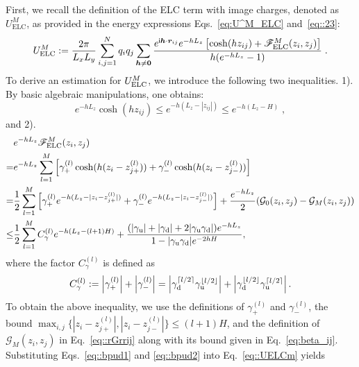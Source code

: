 First, we recall the definition of the ELC term with image charges, denoted as $U_{\text{ELC}}^{M}$, as provided in the energy expressions Eqs.~\eqref{eq:U^M_ELC} and~\eqref{eq::23}:
\begin{equation}\label{eq::UELCm}
U_{\text{ELC}}^{M}:=\frac{2\pi}{L_xL_y}\sum_{i,j=1}^{N}q_iq_j\sum_{\bm{h}\neq \bm{0}} \frac{e^{\mathsf i \bm{h}\cdot\bm{r}_{ij}}e^{-hL_z}\left[\cosh(hz_{ij})+\mathscr{F}_{\text{ELC}}^{M}(z_i,z_j)\right]}{h(e^{-hL_z}-1)}\;.
\end{equation}
To derive an estimation for $U_{\text{ELC}}^{M}$, we introduce the following two inequalities. 
1). By basic algebraic manipulations, one obtains:  
\begin{equation}\label{eq::bpud1}
e^{-hL_z}\cosh(hz_{ij})\leq e^{-h(L_z-|z_{ij}|)}\leq e^{-h(L_z-H)}\;,
\end{equation}
and 2).
\begin{equation}\label{eq::bpud2}
\begin{split}
& e^{-hL_z}\mathscr{F}_{\text{ELC}}^{M}(z_i,z_j) \\
= & e^{-hL_z}\sum\limits_{l=1}^{M}\left[\gamma_{+}^{(l)}\cosh(h(z_i-z_{j+}^{(l)}))+\gamma_{-}^{(l)}\cosh(h(z_i-z_{j-}^{(l)}))\right]\\
= & \frac{1}{2}\sum\limits_{l=1}^{M}\left[\gamma_{+}^{(l)}e^{-h(L_z-|z_i-z_{j+}^{(l)}|)}+\gamma_{-}^{(l)}e^{-h(L_z-|z_i-z_{j-}^{(l)}|)}\right]+\frac{e^{-hL_z}}{2}(\mathcal{G}_{0}(z_i,z_j)-\mathcal{G}_{M}(z_i,z_j))\\
\leq & \frac{1}{2}\sum_{l=1}^{M}C^{(l)}_{\gamma}e^{-h(L_z-(l+1)H)}+\frac{(|\gamma_{\text{u}}|+|\gamma_{\text{d}}| + 2|\gamma_{\text{u}}\gamma_{\text{d}}|)e^{-hL_z}}{1-|\gamma_{\text{u}}\gamma_{\text{d}}|e^{-2hH}},
\end{split}
\end{equation}
where the factor $C^{(l)}_{\gamma}$ is defined as 
\begin{equation}
C^{(l)}_{\gamma}:=\left|\gamma_{+}^{(l)}\right|+\left|\gamma_{-}^{(l)}\right|=\left| \gamma_{\text{d}}^{\lceil l/2 \rceil} \gamma_{\text{u}}^{\lfloor l/2 \rfloor}\right|+\left| \gamma_{\text{d}}^{\lfloor l/2 \rfloor} \gamma_{\text{u}}^{\lceil l/2 \rceil}\right|.
\end{equation}
To obtain the above inequality, we use the definitions of $\gamma_{+}^{(l)}$ and $\gamma_{-}^{(l)}$, the bound $\max_{i,j}\{|z_i-z_{j+}^{(l)}|,|z_i-z_{j-}^{(l)}|\}\leq (l+1)H$, and the definition of $\mathcal{G}_{M}(z_i,z_j)$ in Eq.~\eqref{eq::rGrrij} along with its bound given in Eq.~\eqref{eq:beta_ij}. 
Substituting Eqs.~\eqref{eq::bpud1} and \eqref{eq::bpud2} into Eq.~\eqref{eq::UELCm} yields

